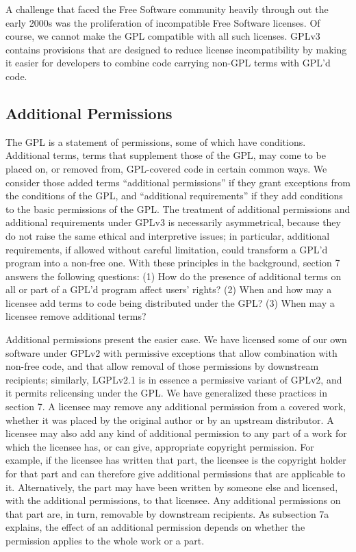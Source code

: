 
A challenge that faced the Free Software community heavily through out the
early 2000s was the proliferation of incompatible Free Software licenses.  Of
course, we cannot make the GPL compatible with all such licenses. GPLv3
contains provisions that are designed to reduce license incompatibility by
making it easier for developers to combine code carrying non-GPL terms with
GPL'd code.


\subsection{Additional Permissions}


The GPL is a statement of permissions, some of which have conditions.
Additional terms, terms that supplement those of the GPL, may come to be
placed on, or removed from, GPL-covered code in certain common ways.  We
consider those added terms ``additional permissions'' if they grant
exceptions from the conditions of the GPL, and ``additional requirements'' if
they add conditions to the basic permissions of the GPL. The treatment of
additional permissions and additional requirements under GPLv3 is necessarily
asymmetrical, because they do not raise the same ethical and interpretive
issues; in particular, additional requirements, if allowed without careful
limitation, could transform a GPL'd program into a non-free one.  With these
principles in the background, section 7 answers the following questions: (1)
How do the presence of additional terms on all or part of a GPL'd program
affect users' rights? (2) When and how may a licensee add terms to code being
distributed under the GPL? (3) When may a licensee remove additional terms?


Additional permissions present the easier case.  We have licensed some of our
own software under GPLv2 with permissive exceptions that allow combination
with non-free code, and that allow removal of those permissions by downstream
recipients; similarly, LGPLv2.1 is in essence a permissive variant of GPLv2,
and it permits relicensing under the GPL.  We have generalized these
practices in section 7.  A licensee may remove any additional permission from
a covered work, whether it was placed by the original author or by an
upstream distributor.  A licensee may also add any kind of additional
permission to any part of a work for which the licensee has, or can give,
appropriate copyright permission. For example, if the licensee has written
that part, the licensee is the copyright holder for that part and can
therefore give additional permissions that are applicable to it.
Alternatively, the part may have been written by someone else and licensed,
with the additional permissions, to that licensee.  Any additional
permissions on that part are, in turn, removable by downstream recipients.
As subsection 7a explains, the effect of an additional permission depends on
whether the permission applies to the whole work or a part.

